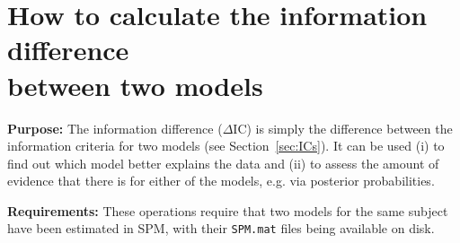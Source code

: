 \documentclass[a4paper,12pt]{article}
\begin{document}
\pagebreak
\section[How to calculate the information difference between two models]{How to calculate the information difference \\ between two models} \label{sec:dIC}

\textbf{Purpose:} The information difference ($\Delta\mathrm{IC}$) is simply the difference between the information criteria for two models (see Section~\ref{sec:ICs}). It can be used (i) to find out which model better explains the data and (ii) to assess the amount of evidence that there is for either of the models, e.g. via posterior probabilities.

\textbf{Requirements:} These operations require that two models for the same subject have been estimated in SPM, with their \texttt{SPM.mat} files being available on disk.
\end{document}
